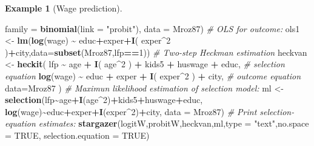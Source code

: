 \documentclass[
  12pt,
]{book}
\newenvironment{Shaded}{\begin{snugshade}}{\end{snugshade}}
\newcommand{\AttributeTok}[1]{\textcolor[rgb]{0.13,0.29,0.53}{#1}}
\newcommand{\CommentTok}[1]{\textcolor[rgb]{0.56,0.35,0.01}{\textit{#1}}}
\newcommand{\ConstantTok}[1]{\textcolor[rgb]{0.56,0.35,0.01}{#1}}
\newcommand{\DecValTok}[1]{\textcolor[rgb]{0.00,0.00,0.81}{#1}}
\newcommand{\FunctionTok}[1]{\textcolor[rgb]{0.13,0.29,0.53}{\textbf{#1}}}
\newcommand{\NormalTok}[1]{#1}
\newcommand{\OtherTok}[1]{\textcolor[rgb]{0.56,0.35,0.01}{#1}}
\newcommand{\SpecialCharTok}[1]{\textcolor[rgb]{0.81,0.36,0.00}{\textbf{#1}}}
\newcommand{\StringTok}[1]{\textcolor[rgb]{0.31,0.60,0.02}{#1}}
\theoremstyle{definition}
\theoremstyle{definition}
\newtheorem{example}{Example}[chapter]
\theoremstyle{definition}
\theoremstyle{definition}
\theoremstyle{remark}
\begin{document}
\begin{example}[Wage prediction]
\begin{Shaded}
\begin{Highlighting}[]
               \AttributeTok{family =} \FunctionTok{binomial}\NormalTok{(}\AttributeTok{link =} \StringTok{"probit"}\NormalTok{), }\AttributeTok{data =}\NormalTok{ Mroz87) }
\CommentTok{\# OLS for outcome:}
\NormalTok{ols1 }\OtherTok{\textless{}{-}} \FunctionTok{lm}\NormalTok{(}\FunctionTok{log}\NormalTok{(wage) }\SpecialCharTok{\textasciitilde{}}\NormalTok{ educ}\SpecialCharTok{+}\NormalTok{exper}\SpecialCharTok{+}\FunctionTok{I}\NormalTok{( exper}\SpecialCharTok{\^{}}\DecValTok{2}\NormalTok{ )}\SpecialCharTok{+}\NormalTok{city,}\AttributeTok{data=}\FunctionTok{subset}\NormalTok{(Mroz87,lfp}\SpecialCharTok{==}\DecValTok{1}\NormalTok{))}
\CommentTok{\# Two{-}step Heckman estimation}
\NormalTok{heckvan }\OtherTok{\textless{}{-}} 
  \FunctionTok{heckit}\NormalTok{( lfp }\SpecialCharTok{\textasciitilde{}}\NormalTok{ age }\SpecialCharTok{+} \FunctionTok{I}\NormalTok{( age}\SpecialCharTok{\^{}}\DecValTok{2}\NormalTok{ ) }\SpecialCharTok{+}\NormalTok{ kids5 }\SpecialCharTok{+}\NormalTok{ huswage }\SpecialCharTok{+}\NormalTok{ educ, }\CommentTok{\# selection equation}
          \FunctionTok{log}\NormalTok{(wage) }\SpecialCharTok{\textasciitilde{}}\NormalTok{ educ }\SpecialCharTok{+}\NormalTok{ exper }\SpecialCharTok{+} \FunctionTok{I}\NormalTok{( exper}\SpecialCharTok{\^{}}\DecValTok{2}\NormalTok{ ) }\SpecialCharTok{+}\NormalTok{ city, }\CommentTok{\# outcome equation}
          \AttributeTok{data=}\NormalTok{Mroz87 )}
\CommentTok{\# Maximun likelihood estimation of selection model:}
\NormalTok{ml }\OtherTok{\textless{}{-}} \FunctionTok{selection}\NormalTok{(lfp}\SpecialCharTok{\textasciitilde{}}\NormalTok{age}\SpecialCharTok{+}\FunctionTok{I}\NormalTok{(age}\SpecialCharTok{\^{}}\DecValTok{2}\NormalTok{)}\SpecialCharTok{+}\NormalTok{kids5}\SpecialCharTok{+}\NormalTok{huswage}\SpecialCharTok{+}\NormalTok{educ, }
                \FunctionTok{log}\NormalTok{(wage)}\SpecialCharTok{\textasciitilde{}}\NormalTok{educ}\SpecialCharTok{+}\NormalTok{exper}\SpecialCharTok{+}\FunctionTok{I}\NormalTok{(exper}\SpecialCharTok{\^{}}\DecValTok{2}\NormalTok{)}\SpecialCharTok{+}\NormalTok{city, }\AttributeTok{data =}\NormalTok{ Mroz87)}
\CommentTok{\# Print selection{-}equation estimates:}
\FunctionTok{stargazer}\NormalTok{(logitW,probitW,heckvan,ml,}\AttributeTok{type =} \StringTok{"text"}\NormalTok{,}\AttributeTok{no.space =} \ConstantTok{TRUE}\NormalTok{,}
          \AttributeTok{selection.equation =} \ConstantTok{TRUE}\NormalTok{)}
\end{Highlighting}
\end{Shaded}


\end{example}
\end{document}
